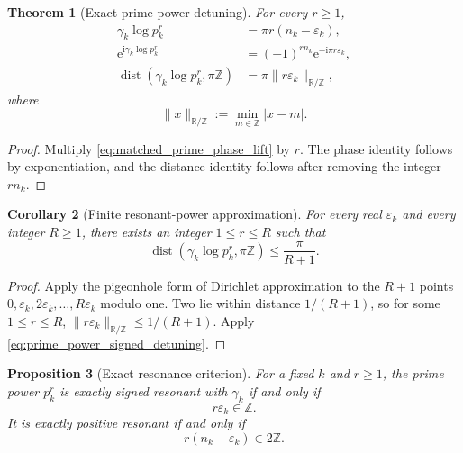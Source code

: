 \documentclass[11pt]{amsart}
\numberwithin{equation}{section}
\theoremstyle{plain}
\newtheorem{theorem}{Theorem}[section]
\newtheorem{proposition}[theorem]{Proposition}
\newtheorem{corollary}[theorem]{Corollary}
\theoremstyle{definition}
\theoremstyle{remark}
\newcommand{\e}{\mathrm e}
\newcommand{\ii}{\mathrm i}
\newcommand{\dist}{\operatorname{dist}}
\newcommand{\R}{\mathbb R}
\begin{document}
\begin{theorem}[Exact prime-power detuning]
\label{thm:exact_prime_power_detuning}
For every $r\geq1$,
\begin{align}
 \gamma_k\log p_k^r
 &=\pi r(n_k-\varepsilon_k),
 \label{eq:prime_power_lift}
 \\
 \e^{\ii\gamma_k\log p_k^r}
 &=(-1)^{rn_k}\e^{-\ii\pi r\varepsilon_k},
 \label{eq:prime_power_phase}
 \\
 \dist(\gamma_k\log p_k^r,\pi\mathbb Z)
 &=\pi\|r\varepsilon_k\|_{\R/\mathbb Z},
 \label{eq:prime_power_signed_detuning}
\end{align}
where
\begin{equation}
 \|x\|_{\R/\mathbb Z}:=\min_{m\in\mathbb Z}|x-m|.
 \label{eq:circle_distance_definition}
\end{equation}
\end{theorem}

\begin{proof}
Multiply \eqref{eq:matched_prime_phase_lift} by $r$.  The phase identity
follows by exponentiation, and the distance identity follows after removing
the integer $rn_k$.
\end{proof}

\begin{corollary}[Finite resonant-power approximation]
\label{cor:finite_resonant_power_approximation}
For every real $\varepsilon_k$ and every integer $R\geq1$, there exists an
integer $1\leq r\leq R$ such that
\begin{equation}
 \dist(\gamma_k\log p_k^r,\pi\mathbb Z)
 \leq\frac{\pi}{R+1}.
 \label{eq:dirichlet_resonant_power_bound}
\end{equation}
\end{corollary}

\begin{proof}
Apply the pigeonhole form of Dirichlet approximation to the $R+1$ points
$0,\varepsilon_k,2\varepsilon_k,\ldots,R\varepsilon_k$ modulo one.  Two lie
within distance $1/(R+1)$, so for some $1\leq r\leq R$,
$\|r\varepsilon_k\|_{\R/\mathbb Z}\leq1/(R+1)$.  Apply
\eqref{eq:prime_power_signed_detuning}.
\end{proof}

\begin{proposition}[Exact resonance criterion]
\label{prop:exact_resonance_criterion}
For a fixed $k$ and $r\geq1$, the prime power $p_k^r$ is exactly signed
resonant with $\gamma_k$ if and only if
\begin{equation}
 r\varepsilon_k\in\mathbb Z.
 \label{eq:exact_signed_resonance_criterion}
\end{equation}
It is exactly positive resonant if and only if
\begin{equation}
 r(n_k-\varepsilon_k)\in2\mathbb Z.
 \label{eq:exact_positive_resonance_criterion}
\end{equation}
\end{proposition}
\end{document}
